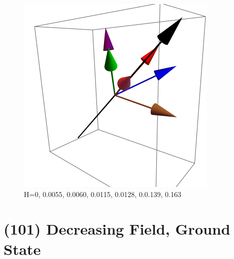 \documentclass{article}
\begin{document}
\begin{figure}[ht]
\includegraphics[scale=0.22]{HVariedData/Pictures/101Inc38S.png}
\caption{H=0, 0.0055, 0.0060, 0.0115, 0.0128, 0.0.139, 0.163}
\end{figure}
\clearpage

\section{(101) Decreasing Field, Ground State}
\end{document}
